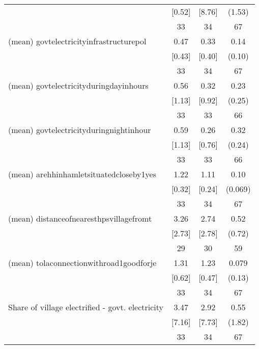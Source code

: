 \begin{table}[htbp]
\begin{tabular*}{0.9\hsize}{@{\hskip\tabcolsep\extracolsep\fill}l*{1}{ccc}}
                                &   [0.52]&   [8.76]&   (1.53)         \\
                                &       33&       34&       67         \\
(mean) govtelectricityinfrastructurepol&     0.47&     0.33&     0.14         \\
                                &   [0.43]&   [0.40]&   (0.10)         \\
                                &       33&       34&       67         \\
(mean) govtelectricityduringdayinhours&     0.56&     0.32&     0.23         \\
                                &   [1.13]&   [0.92]&   (0.25)         \\
                                &       33&       33&       66         \\
(mean) govtelectricityduringnightinhour&     0.59&     0.26&     0.32         \\
                                &   [1.13]&   [0.76]&   (0.24)         \\
                                &       33&       33&       66         \\
(mean) arehhinhamletsituatedcloseby1yes&     1.22&     1.11&     0.10         \\
                                &   [0.32]&   [0.24]&  (0.069)         \\
                                &       33&       34&       67         \\
(mean) distanceofnearesthpsvillagefromt&     3.26&     2.74&     0.52         \\
                                &   [2.73]&   [2.78]&   (0.72)         \\
                                &       29&       30&       59         \\
(mean) tolaconnectionwithroad1goodforje&     1.31&     1.23&    0.079         \\
                                &   [0.62]&   [0.47]&   (0.13)         \\
                                &       33&       34&       67         \\
Share of village electrified - govt. electricity&     3.47&     2.92&     0.55         \\
                                &   [7.16]&   [7.73]&   (1.82)         \\
                                &       33&       34&       67         \\

\end{tabular*}
\end{table}
